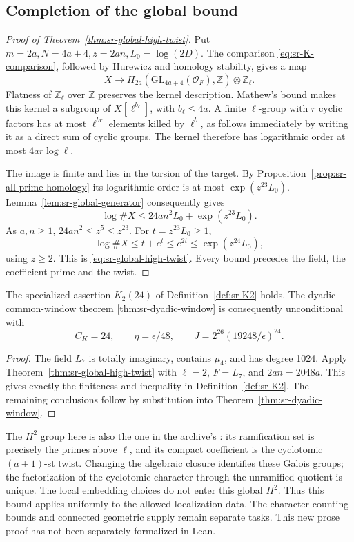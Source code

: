\subsection{Completion of the global bound}
\begin{proof}[Proof of Theorem~\ref{thm:sr-global-high-twist}]
Put \(m=2a,N=4a+4,z=2an,L_0=\log(2D)\).
The comparison \eqref{eq:sr-K-comparison}, followed by Hurewicz
and homology stability, gives a map
\[
 X\longrightarrow
 H_{2a}(\mathrm{GL}_{4a+4}(\mathcal O_F),\mathbb Z)
                                      \otimes\mathbb Z_\ell .
\]
Flatness of \(\mathbb Z_\ell\) over \(\mathbb Z\) preserves the
kernel description. Mathew's bound makes this kernel a subgroup
of \(X[\ell^{b_\ell}]\), with \(b_\ell\leq4a\).
A finite \(\ell\)-group with \(r\) cyclic factors has at most
\(\ell^{br}\) elements killed by \(\ell^b\), as follows immediately
by writing it as a direct sum of cyclic groups.
The kernel therefore has logarithmic order at most
\(4ar\log\ell\).

The image is finite and lies in the torsion of the target.
By Proposition~\ref{prop:sr-all-prime-homology} its logarithmic
order is at most \(\exp(z^{23}L_0)\).
Lemma~\ref{lem:sr-global-generator} consequently gives
\[
 \log\#X\leq24an^2L_0+\exp(z^{23}L_0).
\]
As \(a,n\geq1\), \(24an^2\leq z^5\leq z^{23}\).
For \(t=z^{23}L_0\geq1\),
\[
 \log\#X\leq t+e^t\leq e^{2t}
                    \leq\exp(z^{24}L_0),
\]
using \(z\geq2\). This is \eqref{eq:sr-global-high-twist}.
Every bound precedes the field, the coefficient prime and the twist.
\end{proof}

\begin{srproposition}\label{prop:sr-K2-proved}
The specialized assertion \(K_2(24)\) of
Definition~\ref{def:sr-K2} holds.
The dyadic common-window theorem
\ref{thm:sr-dyadic-window} is consequently unconditional with
\[
 C_K=24,\qquad
 \eta=\epsilon/48,\qquad
 J=2^{26}(19248/\epsilon)^{24}.
\]
\end{srproposition}
\begin{proof}
The field \(L_7\) is totally imaginary, contains \(\mu_4\), and
has degree 1024. Apply Theorem~\ref{thm:sr-global-high-twist}
with \(\ell=2\), \(F=L_7\), and \(2an=2048a\).
This gives exactly the finiteness and inequality in
Definition~\ref{def:sr-K2}.
The remaining conclusions follow by substitution into
Theorem~\ref{thm:sr-dyadic-window}.
\end{proof}

The \(H^2\) group here is also the one in the archive's
: its ramification set is precisely the primes above
\(\ell\), and its compact coefficient is the cyclotomic
\((a+1)\)-st twist.
Changing the algebraic closure identifies these Galois groups;
the factorization of the cyclotomic character through the unramified
quotient is unique. The local embedding choices do not enter this
global \(H^2\).
Thus this bound applies uniformly to the allowed localization data.
The character-counting bounds and connected geometric supply remain
separate tasks. This new prose proof has not been separately
formalized in Lean.
